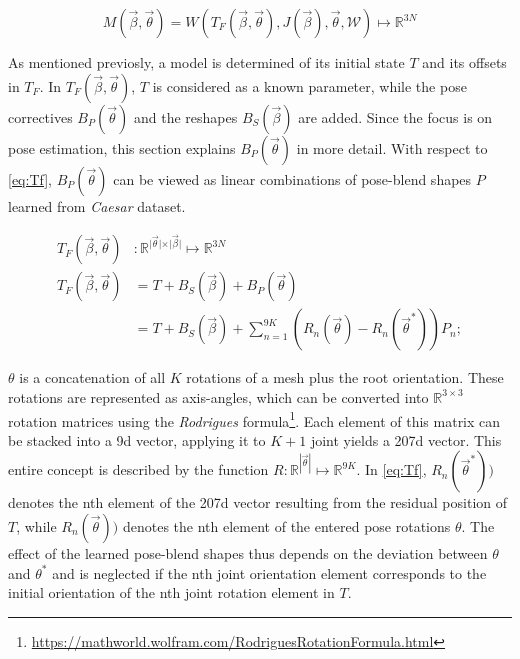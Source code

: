 \begin{equation}
\label{eq:smpl}
M(\vec{\beta},\vec{\theta}) = W(T_{F}(\vec{\beta},\vec{\theta}),J(\vec{\beta}),\vec{\theta},\mathcal{W}) \mapsto \mathbb{R}^{3N}
\end{equation}

As mentioned previosly, a model is determined of its initial state $T$ and its offsets in $T_{F}$. In $T_{F}(\vec{\beta},\vec{\theta})$, $T$ is considered as a known parameter, while the pose correctives $B_{P}(\vec{\theta})$ and the reshapes $B_{S}(\vec{\beta})$ are added. Since the focus is on pose estimation, this section explains $B_{P}(\vec{\theta})$ in more detail. With respect to \autoref{eq:Tf}, $B_{P}(\vec{\theta})$ can be viewed as linear combinations of pose-blend shapes $P$ learned from \emph{Caesar} dataset.

\begin{equation}
\label{eq:Tf}
	\begin{split}
		T_{F}(\vec{\beta},\vec{\theta})&: \mathbb{R}^{\vert \vec{\theta} 			\vert \times \vert \vec{\beta} \vert} \mapsto \mathbb{R}^{3N} \\
		T_{F}(\vec{\beta},\vec{\theta}) &= T + B_{S}(\vec{\beta}) + B_{P}				(\vec{\theta}) \\
		&= T + B_{S}(\vec{\beta}) + \sum_{n=1}^{9K} (R_{n}(\vec{\theta}) - 				R_{n}(\vec{\theta}^{*}))P_{n};
	\end{split}
\end{equation}

$\theta$ is a concatenation of all $K$ rotations of a mesh plus the root orientation. These rotations are represented as axis-angles, which can be converted into $\mathbb{R}^{3\times3}$ rotation matrices using the \emph{Rodrigues} formula\footnote{\url{https://mathworld.wolfram.com/RodriguesRotationFormula.html}}. Each element of this matrix can be stacked into a 9d vector, applying it to $K+1$ joint yields a 207d vector. This entire concept is described by the function 
$R: \mathbb{R}^{|\vec{\theta}|} \mapsto \mathbb{R}^{9K}$. In \autoref{eq:Tf}, $R_{n}(\vec{\theta}^{*}))$ denotes the nth element of the 207d vector resulting from the residual position of $T$, while $R_{n}(\vec{\theta}))$ denotes the nth element of the entered pose rotations $\theta$. The effect of the learned pose-blend shapes thus depends on the deviation between $\theta$ and $\theta^{*}$ and is neglected if the nth joint orientation element corresponds to the initial orientation of the nth joint rotation element in $T$. \\

